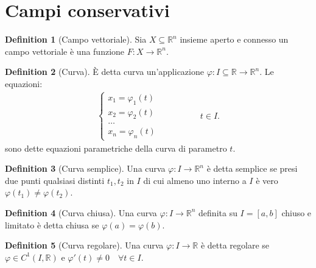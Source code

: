 \documentclass[leqno]{article}
\theoremstyle{definition}
\newtheorem{definition}{Definition}[section]
\numberwithin{equation}{section}
\theoremstyle{remark}
\begin{document}
	\section{Campi conservativi}
	
	\begin{definition}[Campo vettoriale]
		Sia $X \subseteq \mathbb{R}^n$ insieme aperto e connesso un campo vettoriale è una funzione $F:X \to \mathbb{R}^n$.
	\end{definition}
	
	\begin{definition}[Curva]
		È detta curva un'applicazione $\varphi : I \subseteq \mathbb{R} \to \mathbb{R}^n$. Le equazioni:
		\begin{equation}
			\begin{split}
				\begin{cases}
					x_1= \varphi_1 (t)\\
					x_2= \varphi_2 (t)\\
					\dots \\
					x_n= \varphi_n (t)
				\end{cases}
			\end{split}
			\begin{split}
				\quad \quad \quad \quad 
				t \in I.
			\end{split}
		\end{equation}
		sono dette equazioni parametriche della curva di parametro $t$.
	\end{definition}
	
	\begin{definition}[Curva semplice]
		Una curva $\varphi: I \to \mathbb{R}^n$ è detta semplice se presi due punti qualsiasi distinti $t_1, t_2$ in $I$ di cui almeno uno interno a $I$ è vero $\varphi(t_1)\neq \varphi(t_2)$.
	\end{definition}    
	
	\begin{definition}[Curva chiusa]
		Una curva $\varphi: I \to \mathbb{R}^n$ definita su $I=[a,b]$ chiuso e limitato è detta chiusa se $\varphi(a)=\varphi(b)$. 
	\end{definition}
	
	\begin{definition}[Curva regolare]
		Una curva $\varphi: I \to \mathbb{R}$ è detta regolare se $\varphi \in C^1(I,\mathbb{R}) $ e $\varphi '(t) \neq 0 \quad \forall t \in I.$
	\end{definition}
	
\end{document}
